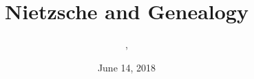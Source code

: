 \documentclass[xcolor=dvipsnames]{beamer}
\title{Nietzsche and Genealogy}
\subtitle{{\CourseNumber}, {\CourseInst}}
\author{\CourseName}
\date{June 14, 2018}
\begin{document}
\begin{frame}
  \titlepage
\end{frame}


\end{document}
